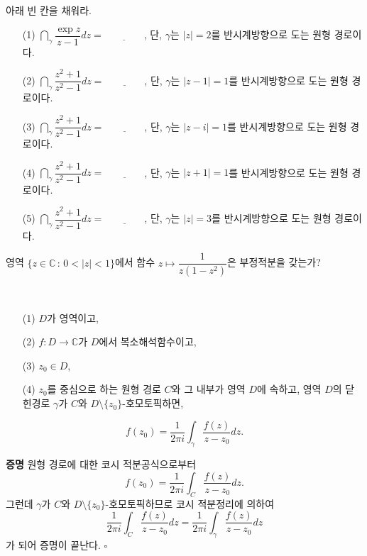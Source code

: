 \begin{salt_exercise} \label{ex-3-25}
아래 빈 칸을 채워라.
\begin{itemize}
\item[(1)] $\dint_\gamma \dfrac{\exp z}{z-1}dz = \underline{\quad\quad\quad\quad}$,
단, $\gamma$는 $|z|=2$를 반시계방향으로 도는 원형 경로이다.
\item[(2)] $\dint_\gamma \dfrac{z^2+1}{z^2-1}dz = \underline{\quad\quad\quad\quad}$,
단, $\gamma$는 $|z-1|=1$를 반시계방향으로 도는 원형 경로이다.
\item[(3)] $\dint_\gamma \dfrac{z^2+1}{z^2-1}dz = \underline{\quad\quad\quad\quad}$,
단, $\gamma$는 $|z-i|=1$를 반시계방향으로 도는 원형 경로이다.
\item[(4)] $\dint_\gamma \dfrac{z^2+1}{z^2-1}dz = \underline{\quad\quad\quad\quad}$,
단, $\gamma$는 $|z+1|=1$를 반시계방향으로 도는 원형 경로이다.
\item[(5)] $\dint_\gamma \dfrac{z^2+1}{z^2-1}dz = \underline{\quad\quad\quad\quad}$,
단, $\gamma$는 $|z|=3$를 반시계방향으로 도는 원형 경로이다.
\end{itemize}
\end{salt_exercise}

\begin{salt_exercise} \label{ex-3-26}
영역 $\{ z\in \mathbb C\,:\, 0<|z|<1\}$에서
함수 $z\mapsto \dfrac1{z(1-z^2)}$은 부정적분을 갖는가?
\end{salt_exercise}

\begin{salt_corollary}  \label{coro-3-5}
\
\begin{itemize}
\item[(1)] $D$가 영역이고, 
\item[(2)] $f:D\to\mathbb C$가 $D$에서 복소해석함수이고,
\item[(3)] $z_0\in D$, 
\item[(4)] $z_0$를 중심으로 하는 원형 경로 $C$와 그 내부가 영역 $D$에 속하고,
영역 $D$의 닫힌경로 $\gamma$가 $C$와 $D\setminus \{z_0\}$-호모토픽하면,
\end{itemize}
\[
f(z_0) = \dfrac1{2\pi i}\int_\gamma \dfrac{f(z)}{z-z_0}dz.
\]
\end{salt_corollary}

{\bf 증명}
원형 경로에 대한 코시 적분공식으로부터
\[
f(z_0) = \dfrac1{2\pi i}\int_C \dfrac{f(z)}{z-z_0}dz.
\]
그런데 $\gamma$가 $C$와 $D\setminus \{z_0\}$-호모토픽하므로
코시 적분정리에 의하여
\[
\dfrac1{2\pi i}\int_C \dfrac{f(z)}{z-z_0}dz = \dfrac1{2\pi i}\int_\gamma \dfrac{f(z)}{z-z_0}dz
\]
가 되어 증명이 끝난다. \hfill $\square$

